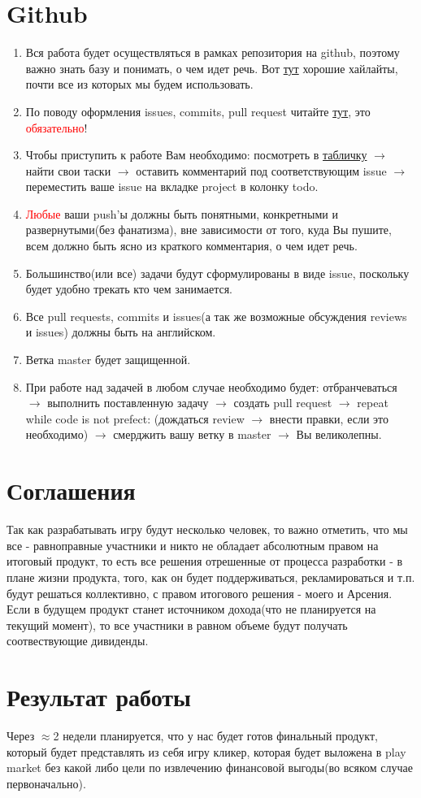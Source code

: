 \documentclass{article}
\begin{document}
\section{Github}
\begin{enumerate}
    \item Вся работа будет осуществляться в рамках репозитория на github, поэтому важно знать базу и понимать, о чем идет речь. Вот \href{https://github.com/features/code-review/}{тут} хорошие хайлайты, почти все из которых мы будем использовать.
    \item По поводу оформления issues, commits, pull request читайте \href{https://github.com/Bazalii/School_Live_Simulator/blob/master/Documents/Project_formalization.pdf}{тут}, это \textcolor{red}{обязательно}!
    \item Чтобы приступить к работе Вам необходимо: посмотреть в \href{https://github.com/Bazalii/School_Live_Simulator/blob/master/Pictures/Task_distribution.JPG}{табличку} $\rightarrow$ найти свои таски $\rightarrow$ оставить комментарий под соответствующим issue $\rightarrow$ переместить ваше issue на вкладке project в колонку todo. 
    \item \textcolor{red}{Любые} ваши push'ы должны быть понятными, конкретными и развернутыми(без фанатизма), вне зависимости от того, куда Вы пушите, всем должно быть ясно из краткого комментария, о чем идет речь.
    \item Большинство(или все) задачи будут сформулированы в виде issue, поскольку будет удобно трекать кто чем занимается.
    \item Все pull requests, commits и issues(а так же возможные обсуждения reviews и issues) должны быть на английском.
    \item Ветка master будет защищенной.
    \item При работе над задачей в любом случае необходимо будет: отбранчеваться $\rightarrow$ выполнить поставленную задачу $\rightarrow$ создать pull request $\rightarrow$ repeat while code is not prefect: (дождаться review $\rightarrow$ внести правки, если это необходимо) $\rightarrow$ смерджить вашу ветку в master $\rightarrow$ Вы великолепны.
     
\end{enumerate}

\section{Соглашения}

Так как разрабатывать игру будут несколько человек, то важно отметить, что мы все - равноправные участники и никто не обладает абсолютным правом на итоговый продукт, то есть все решения отрешенные от процесса разработки - в плане жизни продукта, того, как он будет поддерживаться, рекламироваться и т.п. будут решаться коллективно, с правом итогового решения - моего и Арсения. Если в будущем продукт станет источником дохода(что не планируется на текущий момент), то все участники в равном объеме будут получать соотвествующие дивиденды.

\section{Результат работы}

Через $\approx$2 недели планируется, что у нас будет готов финальный продукт, который будет представлять из себя игру кликер, которая будет выложена в play market без какой либо цели по извлечению финансовой выгоды(во всяком случае первоначально). 
\end{document}
